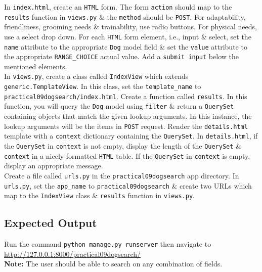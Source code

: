 \documentclass{article}
\begin{document}
In \texttt{index.html}, create an \texttt{HTML} form. The form \texttt{action} should map to the \texttt{results} function in \texttt{views.py} \& the \texttt{method} should be \texttt{POST}. For adaptability, friendliness, grooming needs \& trainability, use radio buttons. For physical needs, use a select drop down. For each \texttt{HTML} form element, i.e., input \& select, set the \texttt{name} attribute to the appropriate \texttt{Dog} model field \& set the \texttt{value} attribute to the appropriate \texttt{RANGE\_CHOICE} actual value. Add a \texttt{submit input} below the mentioned elements. \\

In \texttt{views.py}, create a class called \texttt{IndexView} which extends \texttt{generic.TemplateView}. In this class, set the \texttt{template\_name} to \texttt{practical09dogsearch/index.html}. Create a function called \texttt{results}. In this function, you will query the \texttt{Dog} model using \texttt{filter} \& return a \texttt{QuerySet} containing objects that match the given lookup arguments. In this instance, the lookup arguments will be the items in \texttt{POST} request. Render the \texttt{details.html} template with a \texttt{context} dictionary containing the \texttt{QuerySet}. In \texttt{details.html}, if the \texttt{QuerySet} in \texttt{context} is not empty, display the length of the \texttt{QuerySet} \& \texttt{context} in a nicely formatted \texttt{HTML} table. If the \texttt{QuerySet} in \texttt{context} is empty, display an appropriate message. \\

Create a file called \texttt{urls.py} in the \texttt{practical09dogsearch} app directory. In \texttt{urls.py}, set the \texttt{app\_name} to \texttt{practical09dogsearch} \& create two URLs which map to the \texttt{IndexView} class \& \texttt{results} function in \texttt{views.py}.

\subsection*{Expected Output} 
Run the command \texttt{python manage.py runserver} then navigate to \href{http://127.0.0.1:8000/practical09dogsearch/}{http://127.0.0.1:8000/practical09dogsearch/} \\

\textbf{Note:} The user should be able to search on any combination of fields.
\end{document}
